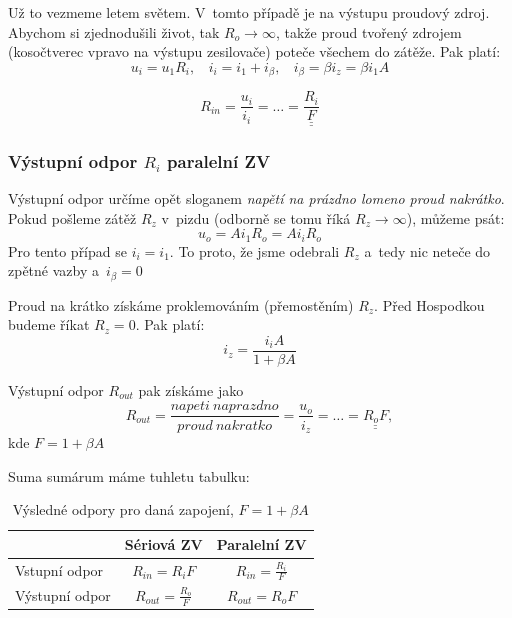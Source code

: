 \documentclass[a4paper,12pt]{article}   %
\begin{document}
Už to vezmeme letem světem. V~tomto případě je na výstupu proudový zdroj. Abychom si zjednodušili život, tak $R_o \rightarrow \infty$, takže proud tvořený zdrojem (kosočtverec vpravo na výstupu zesilovače) poteče všechem do zátěže. Pak platí: 
\begin{equation}
    u_i = u_\text{1} R_i,~~~~i_i=i_\text{1} + i_\beta,~~~~ i_\beta = \beta i_z = \beta i_1 A
\end{equation}

\begin{equation}
    R_{in} = \frac{u_i}{i_i} = \dots = \underline{\underline{\frac{R_i}{F}}}
\end{equation}

\subsubsection*{Výstupní odpor $R_i$ paralelní ZV}
Výstupní odpor určíme opět sloganem \textit{napětí na prázdno lomeno proud nakrátko}.
Pokud pošleme zátěž $R_z$ v~pizdu (odborně se tomu říká $R_z \rightarrow \infty$), můžeme psát:
\begin{equation*}
    u_o = Ai_\text{1}R_o = Ai_iR_o
\end{equation*}
Pro tento případ se $i_i = i_\text{1}$. To proto, že jsme odebrali $R_z$ a~tedy nic neteče do zpětné vazby a~$i_\beta = 0$

Proud na krátko získáme proklemováním (přemostěním) $R_z$. Před Hospodkou budeme říkat $R_z = 0$. Pak platí:
\begin{equation*}
    i_z = \frac{i_i A}{1+\beta A}
\end{equation*}

Výstupní odpor $R_{out}$ pak získáme jako
\begin{equation}
    R_{out} = \frac{napeti~naprazdno}{proud~nakratko} = \frac{u_o}{i_z} = \dots = \underline{\underline{R_o F}},
\end{equation}
kde $F=1+\beta A$

Suma sumárum máme tuhletu tabulku:
\begin{table}[h!]
    \centering
    \begin{tabular}{|l|c|c|}
        \hline
        & Sériová ZV & Paralelní ZV\\\hline\hline
        \rule{0pt}{2.5ex}Vstupní odpor & $R_{in} = R_i F$ & $R_{in} = \frac{R_i}{F}$\\[.7ex]\hline
        \rule{0pt}{2.5ex}Výstupní odpor & $R_{out} = \frac{R_o}{F}$ & $R_{out} = R_o F$\\[.7ex]\hline
    \end{tabular}        
    \caption{Výsledné odpory pro daná zapojení, $F=1+\beta A$}
\end{table}%
\end{document}
